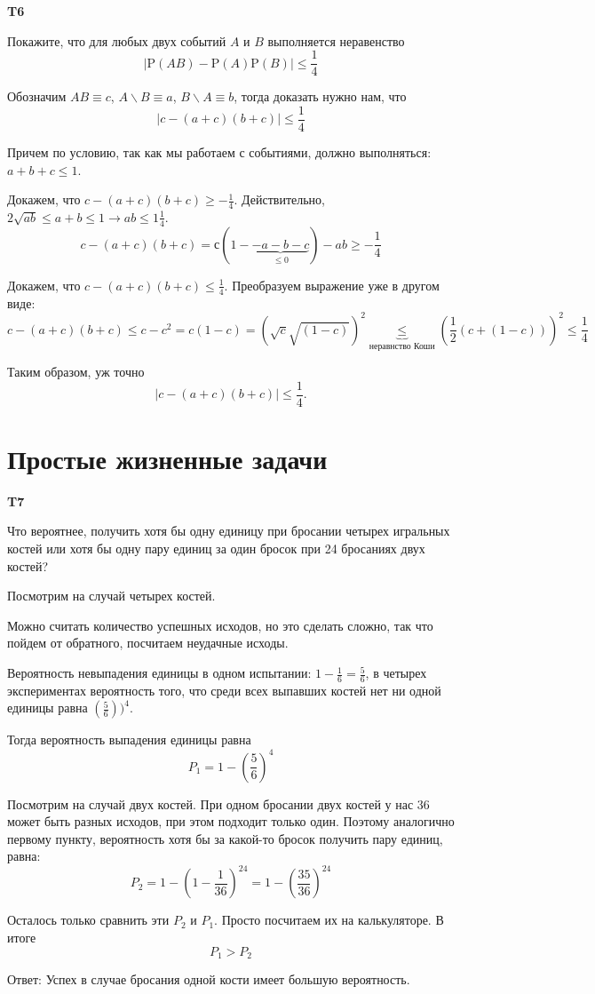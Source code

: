 \documentclass[a4paper,12pt]{article} %
\begin{document}
\begin{example}\textbf{T6}

Покажите, что для любых двух событий $A$ и $B$ выполняется неравенство
$$
|\mathrm{P}(A B)-\mathrm{P}(A) \mathrm{P}(B)| \leq \frac{1}{4}
$$

Обозначим $ A B\equiv c$, $ A\backslash B\equiv a$, $ B\backslash A\equiv b$, тогда доказать нужно нам, что
$$ |c-(a+c)(b+c)|\le \frac{1}{4} $$

Причем по условию, так как мы работаем с событиями, должно выполняться: $ a+b+c\le 1$.

Докажем, что $ c-(a+c)(b+c)\ge -\frac{1}{4}$. Действительно, $ 2\sqrt{ab}\le a+b\le 1 \rightarrow ab\le 1\frac{1}{4}$.
\[ c-(a+c)(b+c)=с(1-\underbrace{-a-b-c}_{\le 0})-ab \ge -\frac{1}{4}\]



Докажем, что $ c-(a+c)(b+c)\le \frac{1}{4}$. Преобразуем выражение уже в другом виде:
\[ c-(a+c)(b+c)\le c-c^2=c(1-c)=(\sqrt{c}\sqrt{(1-c)})^2\underbrace{\le}_{\text{неравнство Коши}}
\left(\frac{1}{2} ( c + ( 1-c ))
\right)^2 \le\frac{1}{4}\]

Таким образом, уж точно
$$ |c-(a+c)(b+c)|\le \frac{1}{4}. $$

\end{example}






\section{Простые жизненные задачи}


\begin{example}\textbf{T7}

Что вероятнее, получить хотя бы одну единицу при бросании четырех игральных костей 
или хотя бы одну пару единиц за один бросок при 24 бросаниях двух костей?

Посмотрим на случай четырех костей.

Можно считать количество успешных исходов, но это сделать сложно, так что пойдем от обратного, посчитаем неудачные исходы.

Вероятность невыпадения единицы в одном испытании: $ 1-\frac{1}{6}=\frac{5}{6}$, в четырех экспериментах вероятность того, что среди всех выпавших костей нет ни одной единицы равна $ \left(\frac{5}{6} \right))^4$. 
 
Тогда вероятность выпадения единицы равна 
$$P_1= 1- (\frac{5}{6})^4$$


Посмотрим на случай двух костей.
При одном бросании двух костей у нас 36 может быть разных исходов, при этом подходит только один.
Поэтому  аналогично первому пункту, вероятность хотя бы за какой-то бросок получить пару единиц, равна:
$$P_2= 1-(1-\frac{1}{36})^{24}=1-\left(\frac{35}{36} \right)^{24} $$

Осталось только сравнить эти $ P_2$ и $ P_1$. Просто посчитаем их на калькуляторе. В итоге 
\[ P_1> P_2 \]


Ответ: Успех в случае бросания одной кости имеет большую вероятность.


\end{example}
\end{document}
